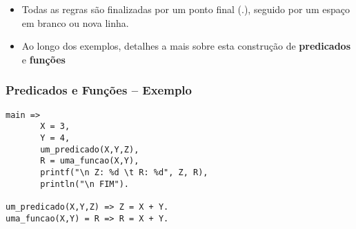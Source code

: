\begin{frame}[fragile,allowframebreaks=0.8,c]
\begin{itemize}
        \begin{itemize}
        
            \item \emph{Cabeça}: indica um padrão de regra a ser casada.\\
            
            Forma geral:
            \begin{tabbing}
                aa \= aaa \= aaa \= aaa \kill
                \> \> $regra(termo_1, \ldots,termo_n)$
            \end{tabbing}
            
            Onde:
            
            \begin{itemize}
                \item \emph{regra} é um átomo que define o nome da regra.
                \item \emph{n} é a aridade da regra (\emph{i.e.} o total de argumentos)
                \item Cada \emph{$termo_i$} é um argumento da regra.
            \end{itemize}
            
            \item \emph{Cond}: é uma ou várias condições sobre a execução desta regra.
                
            \item \emph{Corpo}: define as ações da regra 
            
        \end{itemize}
        
        \item Todas as regras são finalizadas por um ponto final (.), seguido por um espaço 
        em branco ou nova linha.
        
        \item Ao longo dos exemplos, detalhes a mais sobre esta construção de \textbf{predicados} e \textbf{funções}
            
    \end{itemize}

\end{frame}


\begin{frame}[fragile]
	\frametitle{Predicados e Funções -- Exemplo}

\begin{small}
\begin{verbatim}
main =>
       X = 3, 
       Y = 4,
       um_predicado(X,Y,Z),
       R = uma_funcao(X,Y),
       printf("\n Z: %d \t R: %d", Z, R),
       println("\n FIM"). 
       
um_predicado(X,Y,Z) => Z = X + Y.
uma_funcao(X,Y) = R => R = X + Y.
\end{verbatim}

\end{small}
\end{frame}

